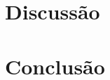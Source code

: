 \documentclass[12pt,a4paper]{article}
\begin{document}
\section{Discussão}




\section{Conclusão}



\end{document}

